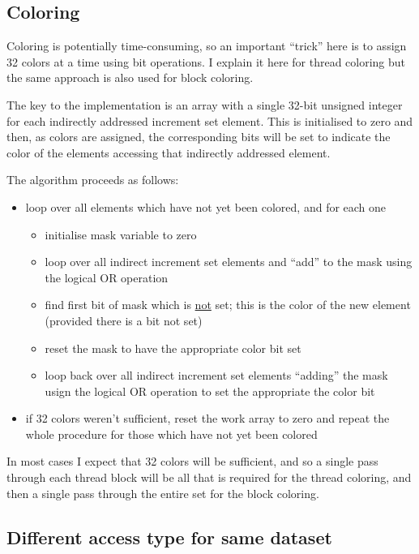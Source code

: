 \documentclass[12pt]{article}
\begin{document}
\newpage

\subsection{Coloring}

Coloring is potentially time-consuming, so an important ``trick'' here 
is to assign 32 colors at a time using bit operations.  I explain it here 
for thread coloring but the same approach is also used for block coloring.

The key to the implementation is an array with a single 32-bit unsigned 
integer for each indirectly addressed increment set element.  This is 
initialised to zero and then, as colors are assigned, the corresponding 
bits will be set to indicate the color of the elements accessing that 
indirectly addressed element.

The algorithm proceeds as follows:
\begin{itemize}
\item
loop over all elements which have not yet been colored, and for each one
  \begin{itemize}
  \item
  initialise mask variable to zero
  \item
  loop over all indirect increment set elements and ``add'' to the mask
  using the logical OR operation
  \item
  find first bit of mask which is \underline{not} set; this is the color 
  of the new element (provided there is a bit not set)
  \item
  reset the mask to have the appropriate color bit set
  \item
  loop back over all indirect increment set elements ``adding'' the mask
  usign the logical OR operation to set the appropriate the  color bit
  \end{itemize}
\item
if 32 colors weren't sufficient, reset the work array to zero and repeat 
the whole procedure for those which have not yet been colored
\end{itemize}


In most cases I expect that 32 colors will be sufficient, and so a 
single pass through each thread block will be all that is required 
for the thread coloring, and then a single pass through the entire 
set for the block coloring.

\subsection{Different access type for same dataset}
\end{document}
